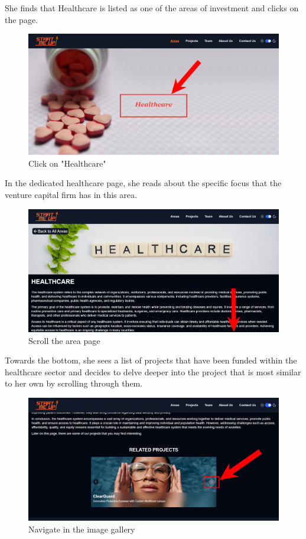 \documentclass[11pt, letterpaper]{article}
\begin{document}
\noindent
She finds that Healthcare is listed as one of the areas of investment and clicks on the page.
\begin{figure}[H]
    \centering
    \includegraphics[width=16cm]{images/Scenarios/Scenario3/Screen4.png}
    \caption{Click on "Healthcare"}
    \label{fig:scenario3_4}
\end{figure}
\noindent
In the dedicated healthcare page, she reads about the specific focus that the venture capital firm has in this area. 
\begin{figure}[H]
    \centering
    \includegraphics[width=16cm]{images/Scenarios/Scenario3/Screen5.png}
    \caption{Scroll the area page}
    \label{fig:scenario3_5}
\end{figure}
\noindent
Towards the bottom, she sees a list of projects that have been funded within the healthcare sector and decides to delve deeper into the project that is most similar to her own by scrolling through them.
\begin{figure}[H]
    \centering
    \includegraphics[width=16cm]{images/Scenarios/Scenario3/Screen6.png}
    \caption{Navigate in the image gallery}
    \label{fig:scenario3_6}
\end{figure}
\end{document}
